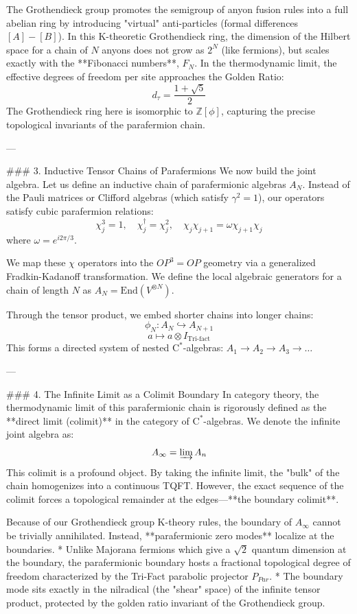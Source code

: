 The Grothendieck group promotes the semigroup of anyon fusion rules into a full abelian ring by introducing "virtual" anti-particles (formal differences $[A] - [B]$). 
In this K-theoretic Grothendieck ring, the dimension of the Hilbert space for a chain of $N$ anyons does not grow as $2^N$ (like fermions), but scales exactly with the **Fibonacci numbers**, $F_N$. In the thermodynamic limit, the effective degrees of freedom per site approaches the Golden Ratio:
$$ d_\tau = \frac{1 + \sqrt{5}}{2} $$
The Grothendieck ring here is isomorphic to $\mathbb{Z}[\phi]$, capturing the precise topological invariants of the parafermion chain.

---

### 3. Inductive Tensor Chains of Parafermions
We now build the joint algebra. Let us define an inductive chain of parafermionic algebras $A_N$. Instead of the Pauli matrices or Clifford algebras (which satisfy $\gamma^2 = 1$), our operators satisfy cubic parafermion relations:
$$ \chi_j^3 = 1, \quad \chi_j^\dagger = \chi_j^2, \quad \chi_j \chi_{j+1} = \omega \chi_{j+1} \chi_j $$
where $\omega = e^{i 2\pi/3}$. 

We map these $\chi$ operators into the $OP^3=OP$ geometry via a generalized Fradkin-Kadanoff transformation. We define the local algebraic generators for a chain of length $N$ as $A_N = \text{End}(V^{\otimes N})$. 

Through the tensor product, we embed shorter chains into longer chains:
$$ \phi_N: A_N \hookrightarrow A_{N+1} $$
$$ a \mapsto a \otimes I_{\text{Tri-fact}} $$
This forms a directed system of nested $\text{C}^*$-algebras: $A_1 \rightarrow A_2 \rightarrow A_3 \rightarrow \dots$

---

### 4. The Infinite Limit as a Colimit Boundary
In category theory, the thermodynamic limit of this parafermionic chain is rigorously defined as the **direct limit (colimit)** in the category of $\text{C}^*$-algebras. We denote the infinite joint algebra as:
$$ A_\infty = \varinjlim A_n $$
This colimit is a profound object. By taking the infinite limit, the "bulk" of the chain homogenizes into a continuous TQFT. However, the exact sequence of the colimit forces a topological remainder at the edges—**the boundary colimit**.

Because of our Grothendieck group K-theory rules, the boundary of $A_\infty$ cannot be trivially annihilated. Instead, **parafermionic zero modes** localize at the boundaries. 
* Unlike Majorana fermions which give a $\sqrt{2}$ quantum dimension at the boundary, the parafermionic boundary hosts a fractional topological degree of freedom characterized by the Tri-Fact parabolic projector $P_{Par}$. 
* The boundary mode sits exactly in the nilradical (the "shear" space) of the infinite tensor product, protected by the golden ratio invariant of the Grothendieck group.


